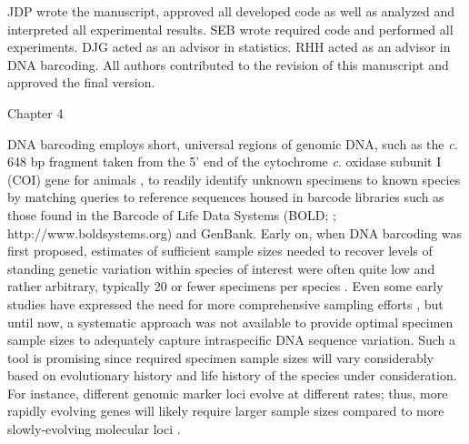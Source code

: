JDP wrote the manuscript, approved all developed code as well as analyzed and \\ interpreted all experimental results. SEB wrote required code and performed all \\ experiments.  DJG acted as an advisor in statistics. RHH acted as an advisor in DNA barcoding. All authors contributed to the revision of this manuscript and approved the final version. 















































Chapter 4

DNA barcoding \cite{hebert2003biological} employs short, universal regions of genomic DNA, such as the \textit{c.} 648 bp fragment taken from the 5' end of the cytochrome \textit{c}. oxidase subunit I (COI) gene for animals \cite{hebert2003barcoding}, to readily identify unknown specimens to known species by matching queries to reference sequences housed in barcode libraries such as those found in the Barcode of Life Data Systems (BOLD; \cite{ratnasingham2007bold}; http://www.boldsystems.org) and GenBank. Early on, when DNA barcoding was first proposed,  estimates of sufficient sample sizes needed to recover levels of standing genetic variation within species of interest were often quite low and rather arbitrary, typically 20 or fewer specimens per species \cite{phillips2019incomplete, phillips2020hacsim, phillips2015exploration}. Even some early studies have expressed the need for more comprehensive sampling efforts \cite{zhang2010estimating}, but until now, a systematic approach was not available to provide optimal specimen sample sizes to adequately capture intraspecific DNA sequence variation. Such a tool is promising since required specimen sample sizes will vary considerably based on evolutionary history and life history of the species under consideration. For instance, different genomic marker loci evolve at different rates; thus, more rapidly evolving genes will likely require larger sample sizes compared to more slowly-evolving molecular loci \cite{phillips2019incomplete}. 



